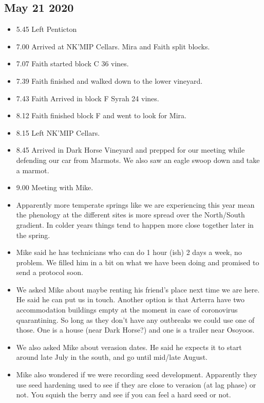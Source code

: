 \documentclass[11pt,letter]{article}
\newenvironment{smitemize}{
\begin{itemize}
  \setlength{\itemsep}{0pt}
  \setlength{\parskip}{0.8pt}
  \setlength{\parsep}{0pt}}
{\end{itemize}
}
\begin{document}
\begin{smitemize}
\end{smitemize}

\subsection {May 21 2020}
\begin{smitemize}
\item 5.45 Left Penticton 
\item 7.00 Arrived at NK'MIP Cellars. Mira and Faith split blocks.
\item 7.07 Faith started block C 36 vines.
\item 7.39 Faith finished and walked down to the lower vineyard. 
\item 7.43 Faith Arrived in block F Syrah 24 vines. 
\item 8.12 Faith finished block F and went to look for Mira.
\item 8.15 Left NK'MIP Cellars.
\item 8.45 Arrived in Dark Horse Vineyard and prepped for our meeting while defending our car from Marmots. We also saw an eagle swoop down and take a marmot.
\item 9.00 Meeting with Mike. 
\item Apparently more temperate springs like we are experiencing this year mean the phenology at the different sites is more spread over the North/South gradient. In colder years things tend to happen more close together later in the spring.
\item Mike said he has technicians who can do 1 hour (ish) 2 days a week, no problem. We filled him in a bit on what we have been doing and promised to send a protocol soon. 
\item We asked Mike about maybe renting his friend's place next time we are here. He said he can put us in touch. Another option is that Arterra have two accommodation buildings empty at the moment in case of coronovirus quarantining. So long as they don't have any outbreaks we could use one of those. One is a house (near Dark Horse?) and one is a trailer near Osoyoos.     
\item We also asked Mike about verasion dates. He said he expects it to start around late July in the south, and go until mid/late August. 
\item Mike also wondered if we were recording seed development. Apparently they use seed hardening used to see if they are close to verasion (at lag phase) or not. You squish the berry and see if you can feel a hard seed or not.  

\end{smitemize}
\end{document}
